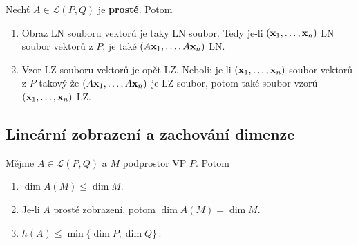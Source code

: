 Nechť $A\in\mathcal L(P,Q)$ je \textbf{prosté}. Potom

\begin{enumerate}
      \item Obraz LN souboru vektorů je taky LN soubor. Tedy je-li $(\mathbf{x}_1,\dots,\mathbf{x}_n)$ LN
            soubor vektorů z $P$, je také $(A\mathbf{x}_1,\dots,A\mathbf{x}_n)$ LN.
      \item Vzor LZ souboru vektorů je opět LZ. Neboli: je-li $(\mathbf{x}_1,\dots,\mathbf{x}_n)$ soubor
            vektorů z $P$ takový že $(A\mathbf{x}_1,\dots,A\mathbf{x}_n)$ je LZ soubor, potom také soubor
            vzorů $(\mathbf{x}_1,\dots,\mathbf{x}_n)$ LZ.
\end{enumerate}

\subsection*{Lineární zobrazení a zachování dimenze}

Mějme $A\in \mathcal L(P,Q)$ a $M$ podprostor VP $P$. Potom

\begin{enumerate}
      \item $\dim A(M) \leq \dim M$.
      \item Je-li $A$ prosté zobrazení, potom $\dim A(M) = \dim M$.
      \item $h(A)\leq \min \{\dim P, \dim Q\}\,.$
\end{enumerate}

\pagebreak
